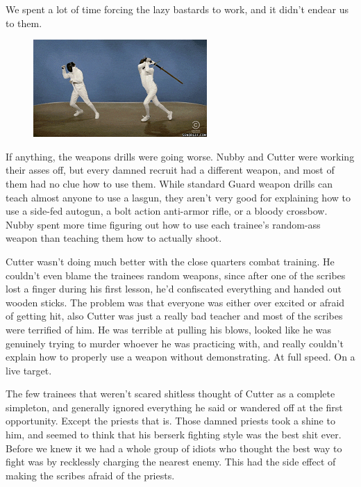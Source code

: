 We spent a lot of time forcing the lazy bastards to work, and it didn’t endear us to them.

\begin{figure}
	\begin{center}
		\includegraphics[width=\figwidth]{pics/8/12.png}
	\end{center}
\end{figure}
If anything, the weapons drills were going worse. 
Nubby and Cutter were working their asses off, but every damned recruit had a different weapon, and most of them had no clue how to use them. 
While standard Guard weapon drills can teach almost anyone to use a lasgun, they aren’t very good for explaining how to use a side-fed autogun, a bolt action anti-armor rifle, or a bloody crossbow. 
Nubby spent more time figuring out how to use each trainee’s random-ass weapon than teaching them how to actually shoot. 


Cutter wasn’t doing much better with the close quarters combat training. 
He couldn’t even blame the trainees random weapons, since after one of the scribes lost a finger during his first lesson, he’d confiscated everything and handed out wooden sticks. 
The problem was that everyone was either over excited or afraid of getting hit, also Cutter was just a really bad teacher and most of the scribes were terrified of him. 
He was terrible at pulling his blows, looked like he was genuinely trying to murder whoever he was practicing with, and really couldn’t explain how to properly use a weapon without demonstrating. 
At full speed. 
On a live target. 


The few trainees that weren’t scared shitless thought of Cutter as a complete simpleton, and generally ignored everything he said or wandered off at the first opportunity. 
Except the priests that is. 
Those damned priests took a shine to him, and seemed to think that his berserk fighting style was the best shit ever. 
Before we knew it we had a whole group of idiots who thought the best way to fight was by recklessly charging the nearest enemy. 
This had the side effect of making the scribes afraid of the priests.

